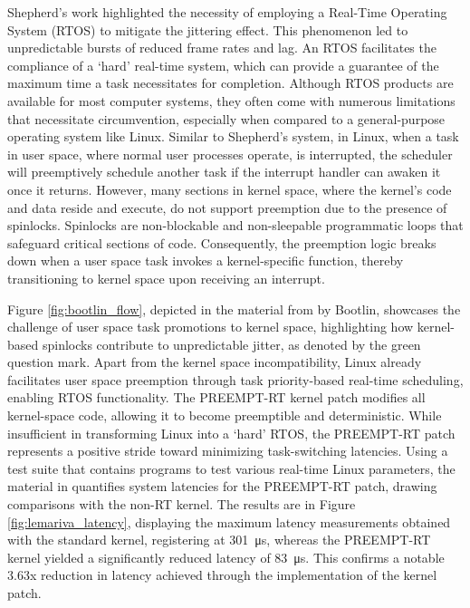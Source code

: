 Shepherd's work highlighted the necessity of employing a Real-Time Operating System (RTOS) to mitigate the jittering effect. This phenomenon led to unpredictable bursts of reduced frame rates and lag. An RTOS facilitates the compliance of a `hard' real-time system, which can provide a guarantee of the maximum time a task necessitates for completion. Although RTOS products are available for most computer systems, they often come with numerous limitations that necessitate circumvention, especially when compared to a general-purpose operating system like Linux. Similar to Shepherd's system, in Linux, when a task in user space, where normal user processes operate, is interrupted, the scheduler will preemptively schedule another task if the interrupt handler can awaken it once it returns. However, many sections in kernel space, where the kernel's code and data reside and execute, do not support preemption due to the presence of spinlocks. Spinlocks are non-blockable and non-sleepable programmatic loops that safeguard critical sections of code. Consequently, the preemption logic breaks down when a user space task invokes a kernel-specific function, thereby transitioning to kernel space upon receiving an interrupt. 

Figure \ref{fig:bootlin_flow}, depicted in the material from \cite{bootlinUnderstandingLinuxRealtime2024} by Bootlin, showcases the challenge of user space task promotions to kernel space, highlighting how kernel-based spinlocks contribute to unpredictable jitter, as denoted by the green question mark. Apart from the kernel space incompatibility, Linux already facilitates user space preemption through task priority-based real-time scheduling, enabling RTOS functionality. The PREEMPT-RT kernel patch modifies all kernel-space code, allowing it to become preemptible and deterministic. While insufficient in transforming Linux into a `hard' RTOS, the PREEMPT-RT patch represents a positive stride toward minimizing task-switching latencies. Using a test suite that contains programs to test various real-time Linux parameters, the material in \cite{maurorivaRaspberryPi4B2019} quantifies system latencies for the PREEMPT-RT patch, drawing comparisons with the non-RT kernel. The results are in Figure \ref{fig:lemariva_latency}, displaying the maximum latency measurements obtained with the standard kernel, registering at \SI{301}{\micro\second}, whereas the PREEMPT-RT kernel yielded a significantly reduced latency of \SI{83}{\micro\second}. This confirms a notable 3.63x reduction in latency achieved through the implementation of the kernel patch.

